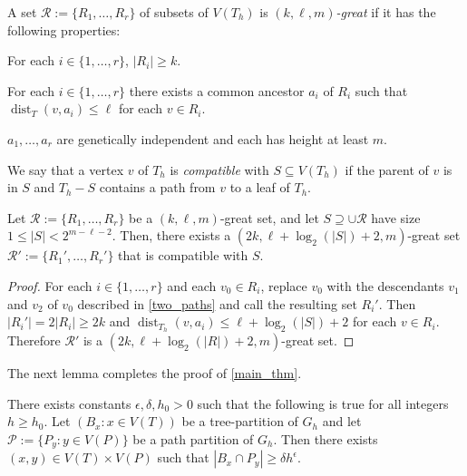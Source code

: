 \documentclass{patmorin}
\newcommand{\defin}[1]{\emph{\color{brightmaroon}#1}}
\DeclareMathOperator{\dist}{dist}
\begin{document}
A set $\mathcal{R}:=\{R_1,\ldots,R_r\}$ of subsets of $V(T_h)$ is \defin{$(k,\ell,m)$-great} if it has the following properties:

\begin{compactenum}
  \item For each $i\in\{1,\ldots,r\}$, $|R_i|\ge k$.
  \item For each $i\in\{1,\ldots,r\}$ there exists a common ancestor $a_i$ of $R_i$ such that $\dist_T(v,a_i)\le\ell$ for each $v\in R_i$.
  \item $a_1,\ldots,a_r$ are genetically independent and each has height at least $m$.
\end{compactenum}

We say that a vertex $v$ of $T_h$ is \defin{compatible} with $S\subseteq V(T_h)$ if the parent of $v$ is in $S$ and $T_h-S$ contains a path from $v$ to a leaf of $T_h$.
  

\begin{lem}\label{compatible_set}
  Let $\mathcal{R}:=\{R_1,\ldots,R_r\}$ be a $(k,\ell,m)$-great set,  and let $S\supseteq \cup\mathcal{R}$ have size $1\le |S|< 2^{m-\ell-2}$.  Then, there exists a $(2k,\ell + \log_2(|S|)+2,m)$-great set $\mathcal{R}':=\{R_1',\ldots,R_r'\}$ that is compatible with $S$.
\end{lem}

\begin{proof}
  For each $i\in\{1,\ldots,r\}$ and each $v_0\in R_i$, replace $v_0$ with the descendants $v_1$ and $v_2$ of $v_0$ described in \cref{two_paths} and call the resulting set $R_i'$.   Then $|R_i'|=2|R_i|\ge 2k$ and $\dist_{T_h}(v,a_i)\le \ell+\log_2(|S|)+2$ for each $v\in R_i$.  Therefore $\mathcal{R}'$ is a $(2k,\ell + \log_2(|R|)+2,m)$-great set.
\end{proof}

The next lemma completes the proof of \cref{main_thm}.
\begin{lem}\label{big_lemma}
  There exists constants $\epsilon,\delta, h_0 >0$ such that the following is true for all integers $h\ge h_0$. Let $(B_x:x\in V(T))$ be a tree-partition of $G_h$ and let $\mathcal{P}:=\{P_y:y\in V(P)\}$ be a path partition of $G_h$.  Then there exists $(x,y)\in V(T)\times V(P)$ such that $|B_x\cap P_y| \ge \delta h^\epsilon$.
\end{lem}
\end{document}
